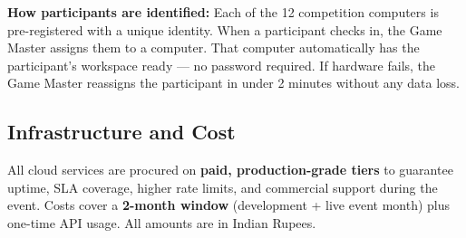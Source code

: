 \documentclass[11pt, a4paper]{article}
\begin{document}
\textbf{How participants are identified:} Each of the 12 competition computers is pre-registered with a unique identity. When a participant checks in, the Game Master assigns them to a computer. That computer automatically has the participant's workspace ready --- no password required. If hardware fails, the Game Master reassigns the participant in under 2 minutes without any data loss.

\subsection{Infrastructure and Cost}
\label{sec:infra}

All cloud services are procured on \textbf{paid, production-grade tiers} to guarantee uptime, SLA coverage, higher rate limits, and commercial support during the event. Costs cover a \textbf{2-month window} (development + live event month) plus one-time API usage. All amounts are in Indian Rupees.
\end{document}
